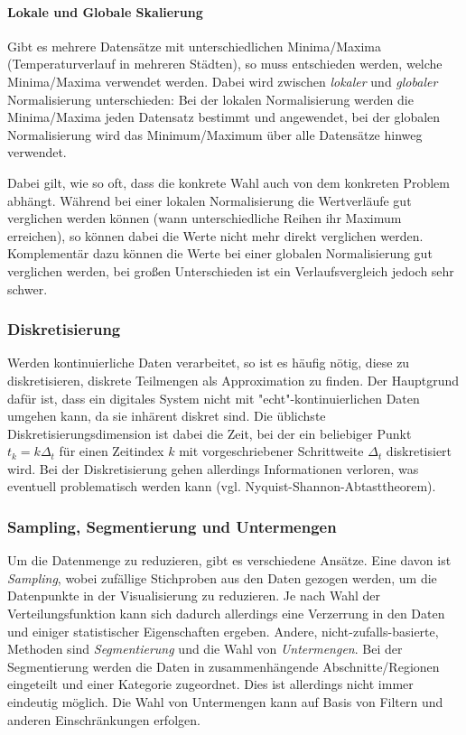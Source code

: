 				\paragraph{Lokale und Globale Skalierung}
					Gibt es mehrere Datensätze mit unterschiedlichen Minima/Maxima (\zB Temperaturverlauf in mehreren Städten), so muss entschieden werden, welche Minima/Maxima verwendet werden. Dabei wird zwischen \emph{lokaler} und \emph{globaler} Normalisierung unterschieden: Bei der lokalen Normalisierung werden die Minima/Maxima jeden Datensatz bestimmt und angewendet, bei der globalen Normalisierung wird das Minimum/Maximum über alle Datensätze hinweg verwendet.

					Dabei gilt, wie so oft, dass die konkrete Wahl auch von dem konkreten Problem abhängt. Während bei einer lokalen Normalisierung die Wertverläufe gut verglichen werden können (\dh wann unterschiedliche Reihen \zB ihr Maximum erreichen), so können dabei die Werte nicht mehr direkt verglichen werden. Komplementär dazu können die Werte bei einer globalen Normalisierung gut verglichen werden, bei großen Unterschieden ist ein Verlaufsvergleich jedoch sehr schwer.

			\subsubsection{Diskretisierung}
				Werden kontinuierliche Daten verarbeitet, so ist es häufig nötig, diese zu diskretisieren, \dh diskrete Teilmengen als Approximation zu finden. Der Hauptgrund dafür ist, dass ein digitales System nicht mit "echt"-kontinuierlichen Daten umgehen kann, da sie inhärent diskret sind. Die üblichste Diskretisierungsdimension ist dabei die Zeit, bei der ein beliebiger Punkt \( t_k = k \Delta_t \) für einen Zeitindex \(k\) mit vorgeschriebener Schrittweite \(\Delta_t\) diskretisiert wird. Bei der Diskretisierung gehen allerdings Informationen verloren, was eventuell problematisch werden kann (vgl. Nyquist-Shannon-Abtasttheorem).

			\subsubsection{Sampling, Segmentierung und Untermengen}
				Um die Datenmenge zu reduzieren, gibt es verschiedene Ansätze. Eine davon ist \emph{Sampling}, wobei zufällige Stichproben aus den Daten gezogen werden, um die Datenpunkte in der Visualisierung zu reduzieren. Je nach Wahl der Verteilungsfunktion kann sich dadurch allerdings eine Verzerrung in den Daten und einiger statistischer Eigenschaften ergeben. Andere, nicht-zufalls-basierte, Methoden sind \emph{Segmentierung} und die Wahl von \emph{Untermengen}. Bei der Segmentierung werden die Daten in zusammenhängende Abschnitte/Regionen eingeteilt und einer Kategorie zugeordnet. Dies ist allerdings nicht immer eindeutig möglich. Die Wahl von Untermengen kann \bspw auf Basis von Filtern und anderen Einschränkungen erfolgen.

